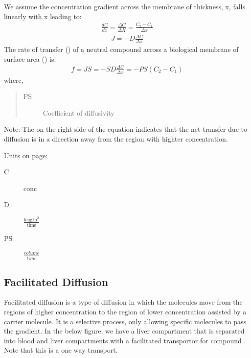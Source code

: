 \documentclass[letterpaper,10pt,english]{sphinxmanual}
\begin{document}
\sphinxAtStartPar
We assume the concentration gradient across the membrane of thickness, x, falls
linearly with x leading to:
\begin{equation*}
\begin{split}\frac{dC}{dx} = \frac{\Delta C}{\Delta X} = \frac{C_2-C_1}{\Delta x}\end{split}
\end{equation*}\begin{equation*}
\begin{split}J = -D \frac{\Delta C}{\Delta x}\end{split}
\end{equation*}
\sphinxAtStartPar
The rate of transfer () of a neutral compound across a biological membrane of
surface area () is:
\begin{equation*}
\begin{split}f = JS = -SD\frac{\Delta C}{\Delta x} = -PS(C_2-C_1)\end{split}
\end{equation*}
\sphinxAtStartPar
where,
\begin{quote}\begin{description}
\item[{PS}] \leavevmode
\sphinxAtStartPar
Coefficient of diffusivity

\end{description}\end{quote}

\sphinxAtStartPar
Note: The  on the right side of the equation indicates that
the net transfer due to diffusion is in a direction away from the region with
highter concentration.

\sphinxAtStartPar
Units on page:
\begin{description}
\item[{C}] \leavevmode
\sphinxAtStartPar
\(\text{conc}\)

\item[{D}] \leavevmode
\sphinxAtStartPar
\(\frac{\text{length}^2}{\text{time}}\)

\item[{PS}] \leavevmode
\sphinxAtStartPar
\(\frac{volume}{time}\)

\end{description}


\subsection{Facilitated Diffusion}
\label{\detokenize{pages/backend/io_info/6_facillitated_diffusion:facilitated-diffusion}}\label{\detokenize{pages/backend/io_info/6_facillitated_diffusion::doc}}
\sphinxAtStartPar
Facilitated  diffusion is a type of diffusion in which the molecules move from
the regions of higher concentration to the region of lower concentration
assisted by a carrier molecule. It is a selective process, only allowing
specific molecules to pass the gradient. In the below figure, we have a
liver compartment that is separated into blood and liver compartments with
a facilitated transportor for compound . Note that this is a one way
transport.
\end{document}

